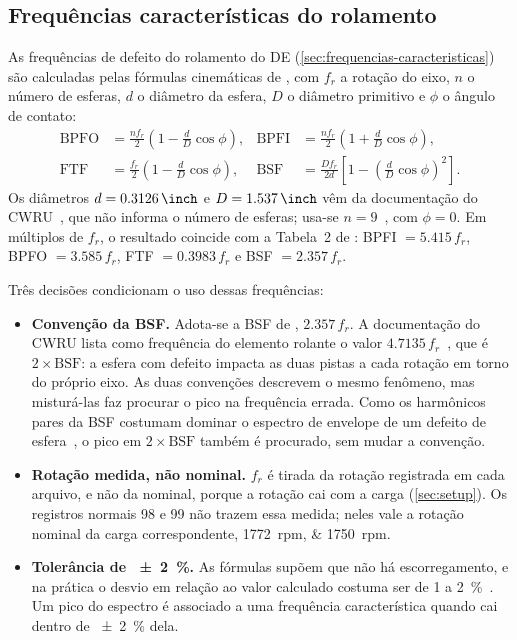 \subsection{Frequências características do rolamento}
\label{sec:features-frequencias}

As frequências de defeito do rolamento do DE (\autoref{sec:frequencias-caracteristicas})
são calculadas pelas fórmulas cinemáticas de \textcite[p.~102]{smith2015}, com
$f_r$ a rotação do eixo, $n$ o número de esferas, $d$ o diâmetro da esfera, $D$
o diâmetro primitivo e $\phi$ o ângulo de contato:
\begin{align}
  \text{BPFO} &= \frac{n f_r}{2}\left(1 - \frac{d}{D}\cos\phi\right), &
  \text{BPFI} &= \frac{n f_r}{2}\left(1 + \frac{d}{D}\cos\phi\right), \\
  \text{FTF}  &= \frac{f_r}{2}\left(1 - \frac{d}{D}\cos\phi\right), &
  \text{BSF}  &= \frac{D f_r}{2d}\left[1 - \left(\frac{d}{D}\cos\phi\right)^2\right].
\end{align}
Os diâmetros $d = \SI{0.3126}{\inch}$ e $D = \SI{1.537}{\inch}$ vêm da
documentação do CWRU~\cite{cwru}, que não informa o número de esferas; usa-se
$n = 9$~\cite[p.~109]{smith2015}, com $\phi = 0$. Em múltiplos de $f_r$, o
resultado coincide com a Tabela~2 de \textcite[p.~103]{smith2015}: BPFI
$= \num{5.415}\,f_r$, BPFO $= \num{3.585}\,f_r$, FTF $= \num{0.3983}\,f_r$ e
BSF $= \num{2.357}\,f_r$.

Três decisões condicionam o uso dessas frequências:
\begin{itemize}
  \item \textbf{Convenção da BSF.} Adota-se a BSF de \textcite{smith2015},
  $\num{2.357}\,f_r$. A documentação do CWRU lista como frequência do elemento
  rolante o valor $\num{4.7135}\,f_r$~\cite{cwru}, que é $2 \times \text{BSF}$:
  a esfera com defeito impacta as duas pistas a cada rotação em torno do próprio eixo. As duas convenções
  descrevem o mesmo fenômeno, mas misturá-las faz procurar o pico na frequência
  errada. Como os harmônicos pares da BSF costumam dominar o espectro de envelope
  de um defeito de esfera~\cite[p.~103]{smith2015}, o pico em $2 \times \text{BSF}$
  também é procurado, sem mudar a convenção.
  \item \textbf{Rotação medida, não nominal.} $f_r$ é tirada da rotação
  registrada em cada arquivo, e não da nominal, porque a rotação cai com a carga
  (\autoref{sec:setup}). Os registros normais 98 e 99 não trazem essa medida;
  neles vale a rotação nominal da carga correspondente, \SIlist{1772;1750}{rpm}.
  \item \textbf{Tolerância de \SI{\pm 2}{\percent}.} As fórmulas supõem que não há
  escorregamento, e na prática o desvio em relação ao valor calculado costuma ser
  de 1 a \SI{2}{\percent}~\cite[p.~102]{smith2015}. Um pico do espectro é associado
  a uma frequência característica quando cai dentro de \SI{\pm 2}{\percent} dela.
\end{itemize}

